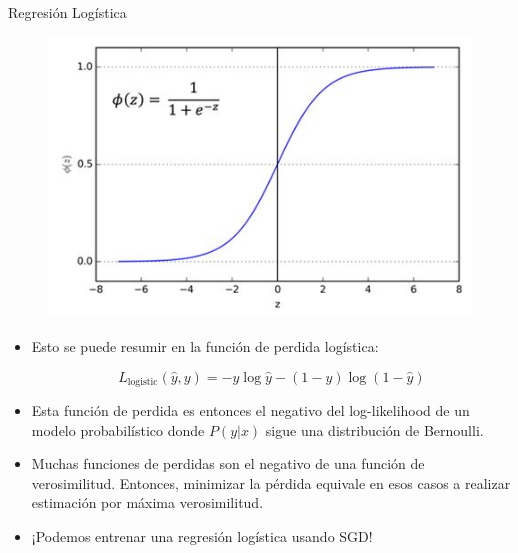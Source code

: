 \documentclass[handout]{beamer}
\begin{document}
\begin{frame}{Regresión Logística}

\begin{figure}[htb]
	\centering
	 \includegraphics[scale=0.35]{imagenes/sigmoid.jpeg}
\end{figure}



\begin{scriptsize}
\begin{itemize}
\item Esto se puede resumir en la  función de perdida logística:

  \begin{displaymath}
  L_{\text{logistic}}(\hat{y},y) = -y \log \hat{y} - (1-y) \log(1-\hat{y})  
 \end{displaymath}


 \item Esta función de perdida es entonces el negativo del log-likelihood de un modelo probabilístico donde $P(y|x)$ sigue una distribución de Bernoulli.

 \item Muchas funciones de perdidas son el negativo de una función de verosimilitud. Entonces, minimizar la pérdida equivale en esos casos a realizar estimación por máxima verosimilitud. 
 
 \item ¡Podemos entrenar una regresión logística usando SGD!
 
\end{itemize}
\end{scriptsize}

\end{frame}
\end{document}
